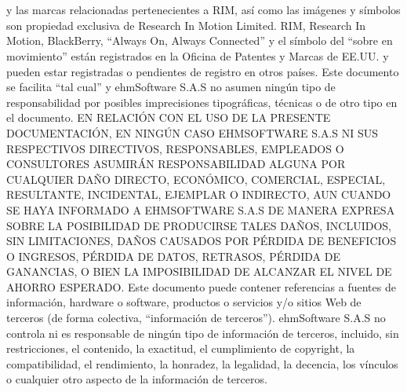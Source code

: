 \chapter{}
\blackberry y las marcas relacionadas pertenecientes a RIM, as\'i como las
im\'agenes y
s\'imbolos son propiedad exclusiva de Research In Motion Limited. RIM, Research
In
Motion,
BlackBerry, ``Always On, Always Connected'' y el s\'imbolo del ``sobre
en movimiento''
est\'an
registrados en la Oficina de Patentes y Marcas de EE.UU. y pueden estar
registradas o
pendientes de registro en otros pa\'ises.
Este documento se facilita ``tal cual'' y ehmSoftware S.A.S no asumen ning\'un
tipo
de
responsabilidad por posibles imprecisiones tipogr\'aficas, t\'ecnicas o de otro
tipo
en el
documento.
EN RELACI\'ON CON EL USO DE LA PRESENTE DOCUMENTACI\'ON, EN NING\'UN
CASO EHMSOFTWARE S.A.S NI SUS RESPECTIVOS DIRECTIVOS, RESPONSABLES,
EMPLEADOS O CONSULTORES ASUMIR\'AN RESPONSABILIDAD ALGUNA POR
CUALQUIER DA\~NO DIRECTO, ECON\'OMICO, COMERCIAL, ESPECIAL, RESULTANTE,
INCIDENTAL, EJEMPLAR O INDIRECTO, AUN CUANDO SE HAYA INFORMADO A
EHMSOFTWARE S.A.S DE MANERA EXPRESA SOBRE LA POSIBILIDAD DE PRODUCIRSE
TALES DA\~NOS, INCLUIDOS, SIN LIMITACIONES, DA\~NOS CAUSADOS POR P\'ERDIDA DE
BENEFICIOS O INGRESOS, P\'ERDIDA DE DATOS, RETRASOS, P\'ERDIDA DE GANANCIAS,
O BIEN LA IMPOSIBILIDAD DE ALCANZAR EL NIVEL DE AHORRO ESPERADO.
Este documento puede contener referencias a fuentes de informaci\'on, hardware o
software,
productos o servicios y/o sitios Web de terceros (de forma colectiva,
``informaci\'on de
terceros''). ehmSoftware S.A.S no controla ni es responsable de ning\'un tipo de
informaci\'on de
terceros, incluido, sin restricciones, el contenido, la exactitud, el
cumplimiento de copyright, la
compatibilidad, el rendimiento, la honradez, la legalidad, la decencia, los
v\'inculos o cualquier
otro aspecto de la informaci\'on de terceros.
